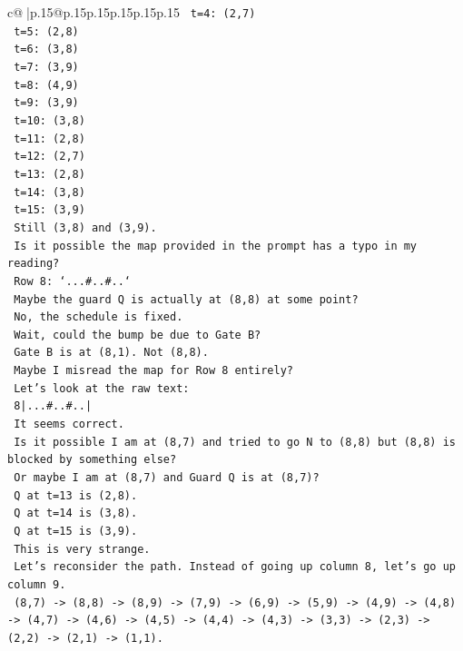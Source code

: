 \documentclass{article}
\begin{document}
{\begin{supertabular}{c@{$\;$}|p{.15\linewidth}@{}p{.15\linewidth}p{.15\linewidth}p{.15\linewidth}p{.15\linewidth}p{.15\linewidth}}
{{{\texttt{   t=4: (2,7)} \\
\texttt{   t=5: (2,8)} \\
\texttt{   t=6: (3,8)} \\
\texttt{   t=7: (3,9)} \\
\texttt{   t=8: (4,9)} \\
\texttt{   t=9: (3,9)} \\
\texttt{   t=10: (3,8)} \\
\texttt{   t=11: (2,8)} \\
\texttt{   t=12: (2,7)} \\
\texttt{   t=13: (2,8)} \\
\texttt{   t=14: (3,8)} \\
\texttt{   t=15: (3,9)} \\
\texttt{   Still (3,8) and (3,9).} \\
\texttt{   Is it possible the map provided in the prompt has a typo in my reading?} \\
\texttt{   Row 8: `...\#..\#..`} \\
\texttt{   Maybe the guard Q is actually at (8,8) at some point?} \\
\texttt{   No, the schedule is fixed.} \\
\texttt{   Wait, could the bump be due to Gate B?} \\
\texttt{   Gate B is at (8,1). Not (8,8).} \\
\texttt{   Maybe I misread the map for Row 8 entirely?} \\
\texttt{   Let's look at the raw text:} \\
\texttt{   8|...\#..\#..|} \\
\texttt{   It seems correct.} \\
\texttt{   Is it possible I am at (8,7) and tried to go N to (8,8) but (8,8) is blocked by something else?} \\
\texttt{   Or maybe I am at (8,7) and Guard Q is at (8,7)?} \\
\texttt{   Q at t=13 is (2,8).} \\
\texttt{   Q at t=14 is (3,8).} \\
\texttt{   Q at t=15 is (3,9).} \\
\texttt{   This is very strange.} \\
\texttt{   Let's reconsider the path. Instead of going up column 8, let's go up column 9.} \\
\texttt{   (8,7) {-}> (8,8) {-}> (8,9) {-}> (7,9) {-}> (6,9) {-}> (5,9) {-}> (4,9) {-}> (4,8) {-}> (4,7) {-}> (4,6) {-}> (4,5) {-}> (4,4) {-}> (4,3) {-}> (3,3) {-}> (2,3) {-}> (2,2) {-}> (2,1) {-}> (1,1).} \\
}}}
\end{supertabular}}
\end{document}
